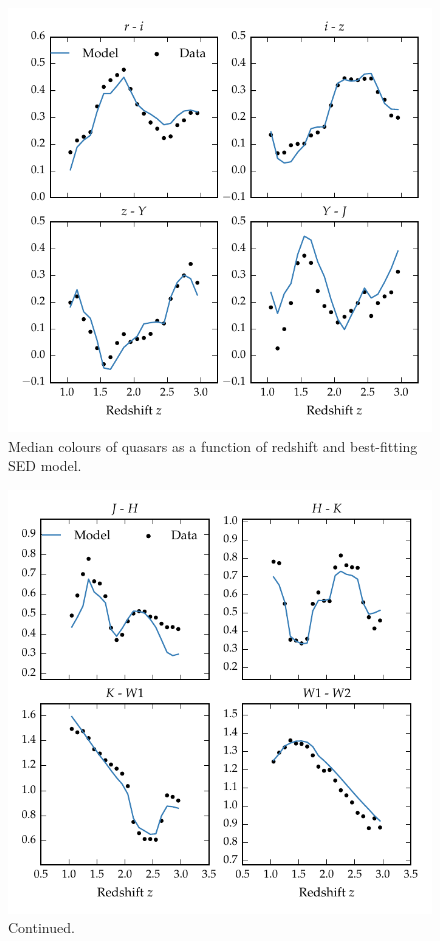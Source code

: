 \begin{figure}[t!]
\includegraphics[width=\textwidth]{figures/chapter05/sed_color_plot_1.pdf}
\caption[{Median colours of quasars as a function of redshift and best-fitting SED model.}]{Median colours of quasars as a function of redshift and best-fitting SED model.}
  \label{fig:color}
\end{figure} 

\begin{figure}[t!]
\ContinuedFloat
    \centering
    \includegraphics[width=\columnwidth]{figures/chapter05/sed_color_plot_2.pdf} 
    \caption[]{Continued.}     
\end{figure}

